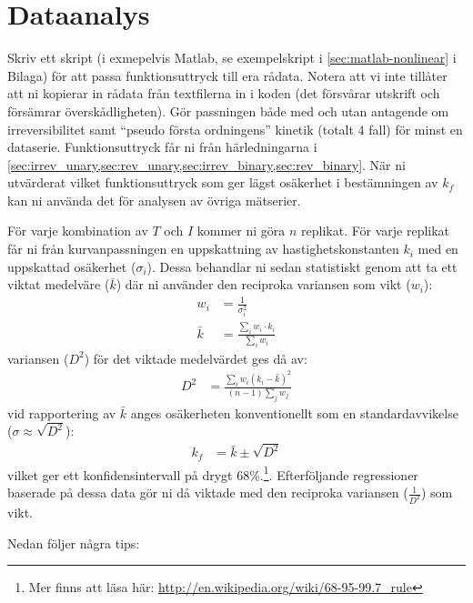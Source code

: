 \section{Dataanalys}
\label{sec:analys}
Skriv ett skript (i exmepelvis Matlab, se exempelskript i
\cref{sec:matlab-nonlinear} i Bilaga) för att passa funktionsuttryck till
era rådata. Notera att vi inte tillåter att ni kopierar in rådata från
textfilerna in i koden (det försvårar utskrift och försämrar
överskådligheten). Gör passningen både med och utan antagende om
irreversibilitet samt ``pseudo första ordningens'' kinetik (totalt 4
fall) för minst en dataserie. Funktionsuttryck får ni från härledningarna
i \cref{sec:irrev_unary,sec:rev_unary,sec:irrev_binary,sec:rev_binary}.
När ni utvärderat vilket funktionsuttryck som ger lägst osäkerhet i
bestämningen av $k_f$ kan ni använda det för analysen av övriga
mätserier.

För varje kombination av $T$ och $I$ kommer ni göra $n$ replikat. För
varje replikat får ni från kurvanpassningen en uppskattning av
hastighetskonstanten $k_i$ med en uppskattad osäkerhet
($\sigma_i$). Dessa behandlar ni sedan statistiskt genom att ta ett
viktat medelväre ($\bar{k}$) där ni använder den reciproka variansen som
vikt ($w_i$):
\begin{align}
  w_i &= \frac{1}{\sigma_i^2} \\
  \bar{k} &= \frac{\sum_i{w_i \cdot k_i}}{\sum_i{w_i}}
\end{align}
variansen ($D^2$) för det viktade medelvärdet ges då av:
\begin{align}
   D^2 &= \frac{\sum_i w_i(k_i - \bar{k})^2}{(n - 1)\sum_j w_j}
\end{align}
vid rapportering av $\bar{k}$ anges osäkerheten konventionellt som en
standardavvikelse ($\sigma \approx \sqrt{D^2}$):
\begin{align}
  k_f &= \bar{k} \pm \sqrt{D^2}
\end{align}
vilket ger ett konfidensintervall på drygt 68\%.\footnote{
Mer finns att läsa här:
\url{http://en.wikipedia.org/wiki/68-95-99.7\_rule}
}. Efterföljande regressioner baserade på dessa
data gör ni då viktade med den reciproka variansen ($\frac{1}{D^2}$) som
vikt.

Nedan följer några tips:

